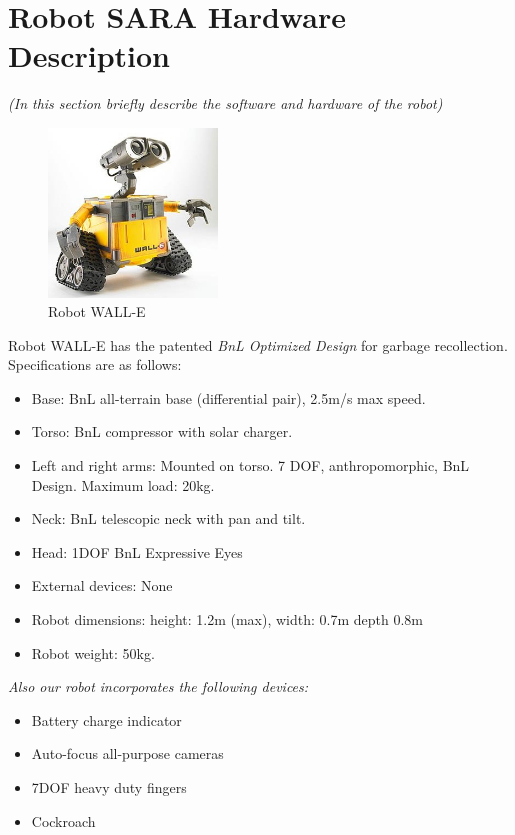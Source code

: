 \section*{Robot SARA Hardware Description}
\textit{(In this section briefly describe the software and hardware of the robot)}


\setlength\intextsep{0pt}
\begin{figure}
	\centering
	\includegraphics[width=0.4\textwidth]{images/wall-e.jpg}
	\caption{Robot WALL-E}
	\label{fig:wall-e}
\end{figure}

Robot WALL-E has the patented \textit{BnL Optimized Design} for garbage recollection. Specifications are as follows:

\begin{itemize}
	\item Base: BnL all-terrain base (differential pair), 2.5m/s max speed.
	\item Torso: BnL compressor with solar charger.
	\item Left and right arms: Mounted on torso. 7 DOF, anthropomorphic, BnL Design. Maximum load: 20kg.
	\item Neck: BnL telescopic neck with pan and tilt.
	\item Head: 1DOF BnL Expressive Eyes
	\item External devices: None
	\item Robot dimensions: height: 1.2m (max), width: 0.7m depth 0.8m
	\item Robot weight: 50kg.
\end{itemize}

\textit{Also our robot incorporates the following devices:}

\begin{itemize}
	\item \BnL Battery charge indicator
	\item \BnL Auto-focus all-purpose cameras
	\item \BnL 7DOF heavy duty fingers
	\item \BnL Cockroach
\end{itemize}

